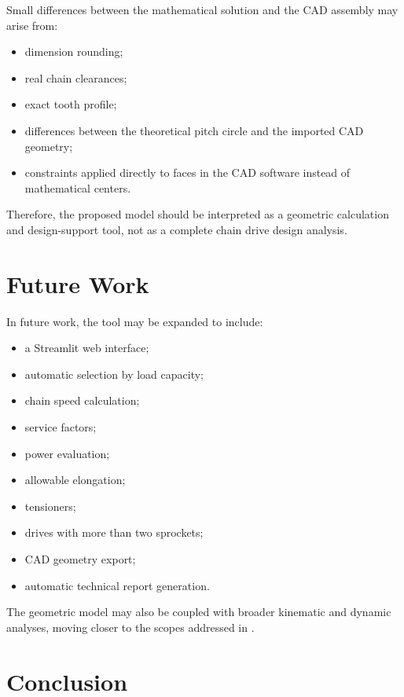 \documentclass[12pt,a4paper]{article}
\begin{document}
Small differences between the mathematical solution and the CAD assembly may arise from:

\begin{itemize}
    \item dimension rounding;
    \item real chain clearances;
    \item exact tooth profile;
    \item differences between the theoretical pitch circle and the imported CAD geometry;
    \item constraints applied directly to faces in the CAD software instead of mathematical centers.
\end{itemize}

Therefore, the proposed model should be interpreted as a geometric calculation and design-support tool, not as a complete chain drive design analysis.

\section{Future Work}

In future work, the tool may be expanded to include:

\begin{itemize}
    \item a Streamlit web interface;
    \item automatic selection by load capacity;
    \item chain speed calculation;
    \item service factors;
    \item power evaluation;
    \item allowable elongation;
    \item tensioners;
    \item drives with more than two sprockets;
    \item CAD geometry export;
    \item automatic technical report generation.
\end{itemize}

The geometric model may also be coupled with broader kinematic and dynamic analyses, moving closer to the scopes addressed in \cite{fuglede2016jsv,fuglede2016mmt,kim2017,lanaspeze2024}.

\section{Conclusion}
\end{document}
